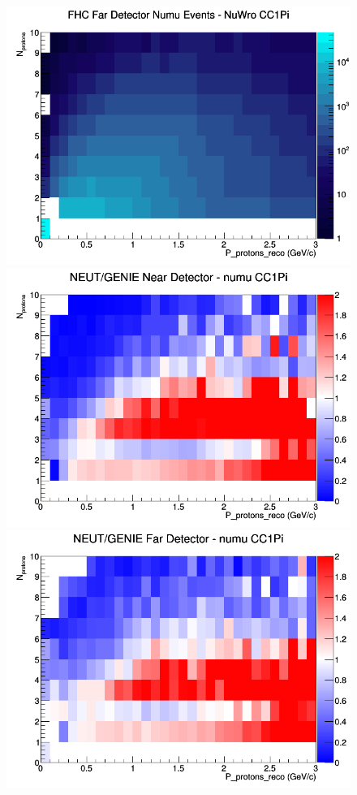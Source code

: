 \begin{figure}[h]
\endminipage
{}
\includegraphics[width=\linewidth]{eff_N_P/GAr/protons/CC1Pi_FHC_FD_numu_N_P_NuWro.png}
\endminipage
\newline
{}
\includegraphics[width=\linewidth]{eff_N_P/GAr/protons/ratios/CC1Pi_NEUT_GENIE_numu_near_N_P.png}
\endminipage
{}
\includegraphics[width=\linewidth]{eff_N_P/GAr/protons/ratios/CC1Pi_NEUT_GENIE_numu_far_N_P.png}

\end{figure}
